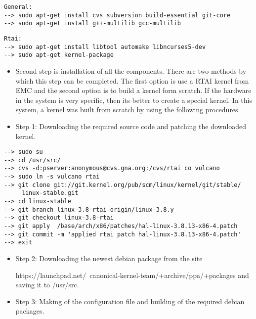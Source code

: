 \begin{lstlisting}
General:
--> sudo apt-get install cvs subversion build-essential git-core 
--> sudo apt-get install g++-multilib gcc-multilib
\end{lstlisting}
\pagebreak
\begin{lstlisting}
Rtai: 
--> sudo apt-get install libtool automake libncurses5-dev 
--> sudo apt-get kernel-package
\end{lstlisting}
\begin{itemize}
\item Second step is installation of all the components. There are two methods by which this step can be completed. The first option is use a RTAI kernel from EMC and the second option is to build a kernel form scratch. If the hardware in the system is very specific, then its better to create a special kernel. In this system, a kernel was built from scratch by using the following procedures.
\item Step 1: Downloading the required source code and patching the downloaded kernel. 
\end{itemize}
\begin{lstlisting}
--> sudo su
--> cd /usr/src/
--> cvs -d:pserver:anonymous@cvs.gna.org:/cvs/rtai co vulcano 
--> sudo ln -s vulcano rtai
--> git clone git://git.kernel.org/pub/scm/linux/kernel/git/stable/
     linux-stable.git 
--> cd linux-stable 
--> git branch linux-3.8-rtai origin/linux-3.8.y 
--> git checkout linux-3.8-rtai 
--> git apply  /base/arch/x86/patches/hal-linux-3.8.13-x86-4.patch 
--> git commit -m 'applied rtai patch hal-linux-3.8.13-x86-4.patch' 
--> exit
\end{lstlisting}
\begin{itemize}
\item Step 2: Downloading the newest debian package from the site 

 https://launchpad.net/~canonical-kernel-team/+archive/ppa/+packages and saving it to /usr/src.

\item Step 3: Making of the configuration file and building of the required debian packages.
\end{itemize}

